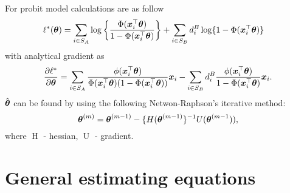 \documentclass[
  letterpaper,
  DIV=11,
  numbers=noendperiod]{scrreprt}
\begin{document}
For probit model calculations are as follow \[
\begin{align*}
    \ell^{*}(\boldsymbol{\theta}) & = \sum_{i \in S_{A}}\log\left\{\frac{\Phi(\boldsymbol{x}_{i}^{\top}\boldsymbol{\theta})}{1 - \Phi(\boldsymbol{x}_{i}^{\top}\boldsymbol{\theta})}\right\} + \sum_{i \in S_{B}}d_{i}^{B}\log\{1 - \Phi(\boldsymbol{x}_{i}^{\top}\boldsymbol{\theta})\}
\end{align*}
\] with analytical gradient as \[
\begin{align*}
        \frac{\partial \ell^*}{\partial\boldsymbol{\theta}} = \sum_{i \in S_A}\frac{\phi(\boldsymbol{x}_i^{\top}\boldsymbol{\theta})}{\Phi(\boldsymbol{x}_i^{\top}\boldsymbol{\theta})(1 - \Phi(\boldsymbol{x}_i^{\top}\boldsymbol{\theta}))}\boldsymbol{x}_i - \sum_{i \in S_B}d_i^B\frac{\phi(\boldsymbol{x}_i^{\top}\boldsymbol{\theta})}{1 - \Phi(\boldsymbol{x}_i^{\top}\boldsymbol{\theta})}\boldsymbol{x}_i.
\end{align*}
\] \(\hat{\boldsymbol{\theta}}\) can be found by using the following
Netwon-Raphson's iterative method: \[
\boldsymbol{\theta}^{(m)} = \boldsymbol{\theta}^{(m-1)} - \{H(\boldsymbol{\theta}^{(m-1)}\}^{-1}U(\boldsymbol{\theta}^{(m-1})),
\] where \(\operatorname{H}\) - hessian, \(\operatorname{U}\) -
gradient.

\hypertarget{general-estimating-equations}{%
\section{General estimating
equations}\label{general-estimating-equations}}
\end{document}
